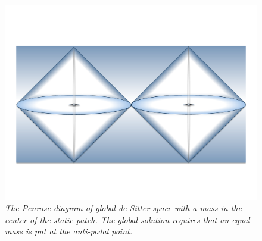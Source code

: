 \documentclass[a4paper,12pt]{article}
\begin{document}








\begin{figure}[btp]
\begin{center}
\vspace{-1.4 cm}
\includegraphics[scale=0.44]{Global-dS.pdf}
\vspace{-1.6 cm}
\caption{\small \it The Penrose diagram of global de Sitter space with a mass in the center of the static patch. The global solution requires that an equal mass is put at the anti-podal point.}
\label{prenroseglobal}
\end{center}
\vspace{-0.2 cm}
\end{figure}
\end{document}
